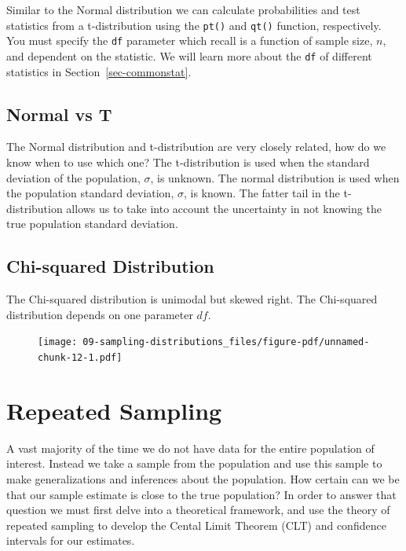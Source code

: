 \documentclass[
  letterpaper,
  DIV=11,
  numbers=noendperiod]{scrreprt}
\theoremstyle{definition}
\theoremstyle{remark}
\begin{document}
Similar to the Normal distribution we can calculate probabilities and
test statistics from a t-distribution using the \texttt{pt()} and
\texttt{qt()} function, respectively. You must specify the \texttt{df}
parameter which recall is a function of sample size, \(n\), and
dependent on the statistic. We will learn more about the \texttt{df} of
different statistics in Section~\ref{sec-commonstat}.

\hypertarget{normal-vs-t}{%
\subsection{Normal vs T}\label{normal-vs-t}}

The Normal distribution and t-distribution are very closely related, how
do we know when to use which one? The t-distribution is used when the
standard deviation of the population, \(\sigma\), is unknown. The normal
distribution is used when the population standard deviation, \(\sigma\),
is known. The fatter tail in the t-distribution allows us to take into
account the uncertainty in not knowing the true population standard
deviation.

\hypertarget{chi-squared-distribution}{%
\subsection{Chi-squared Distribution}\label{chi-squared-distribution}}

The Chi-squared distribution is unimodal but skewed right. The
Chi-squared distribution depends on one parameter \(df\).

\begin{figure}

{\centering \texttt{[image: 09-sampling-distributions\_files/figure-pdf/unnamed-chunk-12-1.pdf]}

}

\end{figure}

\hypertarget{sec-repeat-sample}{%
\section{Repeated Sampling}\label{sec-repeat-sample}}

A vast majority of the time we do not have data for the entire
population of interest. Instead we take a sample from the population and
use this sample to make generalizations and inferences about the
population. How certain can we be that our sample estimate is close to
the true population? In order to answer that question we must first
delve into a theoretical framework, and use the theory of repeated
sampling to develop the Cental Limit Theorem (CLT) and confidence
intervals for our estimates.
\end{document}

